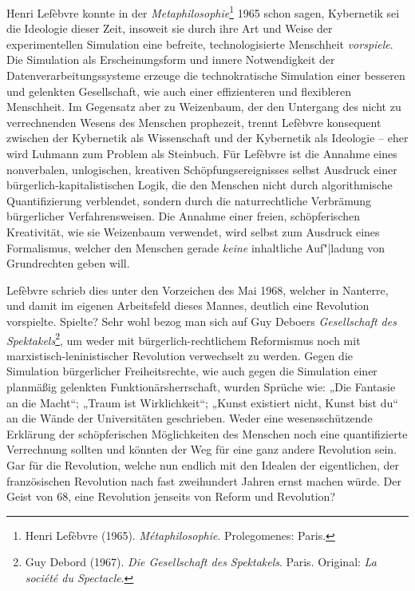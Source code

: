 \documentclass[12pt,a4paper]{article}
\begin{document}
Henri Lefèbvre konnte in der \emph{Metaphilosophie}\footnote{Henri Lefèbvre
  (1965).  \emph{Métaphilosophie}. Prolegomenes: Paris.} 1965 schon sagen,
Kybernetik sei die Ideologie dieser Zeit, insoweit sie durch ihre Art und
Weise der experimentellen Simulation eine befreite, technologisierte
Menschheit \emph{vorspiele}. Die Simulation als Erscheinungsform und innere
Notwendigkeit der Datenverarbeitungssysteme erzeuge die technokratische
Simulation einer besseren und gelenkten Gesellschaft, wie auch einer
effizienteren und flexibleren Menschheit. Im Gegensatz aber zu Weizenbaum, der
den Untergang des nicht zu verrechnenden Wesens des Menschen prophezeit,
trennt Lefèbvre konsequent zwischen der Kybernetik als Wissenschaft und der
Kybernetik als Ideologie -- eher wird Luhmann zum Problem als Steinbuch. Für
Lefèbvre ist die Annahme eines nonverbalen, unlogischen, kreativen
Schöpfungsereignisses selbst Ausdruck einer bürgerlich-kapitalistischen Logik,
die den Menschen nicht durch algorithmische Quantifizierung verblendet,
sondern durch die naturrechtliche Verbrämung bürgerlicher Verfahrensweisen.
Die Annahme einer freien, schöpferischen Kreativität, wie sie Weizenbaum
verwendet, wird selbst zum Ausdruck eines Formalismus, welcher den Menschen
gerade \emph{keine} inhaltliche Auf"|ladung von Grundrechten geben will.

Lefèbvre schrieb dies unter den Vorzeichen des Mai 1968, welcher in Nanterre,
und damit im eigenen Arbeitsfeld dieses Mannes, deutlich eine Revolution
vorspielte. Spielte? Sehr wohl bezog man sich auf Guy Deboers
\emph{Gesellschaft des Spektakels}\footnote{Guy Debord (1967). \emph{Die
    Gesellschaft des Spektakels}.  Paris. Original: \emph{La société du
    Spectacle}. }, um weder mit bürgerlich-rechtlichem Reformismus noch mit
marxistisch-leninistischer Revolution verwechselt zu werden. Gegen die
Simulation bürgerlicher Freiheitsrechte, wie auch gegen die Simulation einer
planmäßig gelenkten Funktionärsherrschaft, wurden Sprüche wie: „Die Fantasie
an die Macht“; „Traum ist Wirklichkeit“; „Kunst existiert nicht, Kunst bist
du“ an die Wände der Universitäten geschrieben.  Weder eine wesensschützende
Erklärung der schöpferischen Möglichkeiten des Menschen noch eine
quantifizierte Verrechnung sollten und könnten der Weg für eine ganz andere
Revolution sein.  Gar für die Revolution, welche nun endlich mit den Idealen
der eigentlichen, der französischen Revolution nach fast zweihundert Jahren
ernst machen würde. Der Geist von 68, eine Revolution jenseits von Reform und
Revolution?
\end{document}

